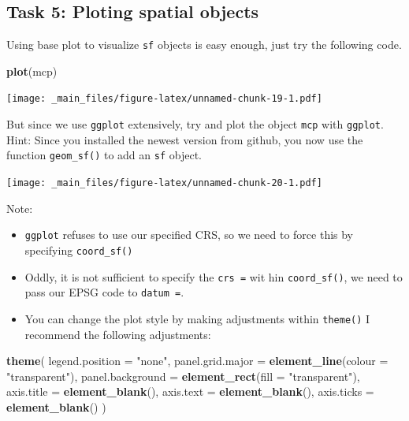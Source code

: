 \documentclass[]{book}
\newenvironment{Shaded}{\begin{snugshade}}{\end{snugshade}}
\newcommand{\KeywordTok}[1]{\textcolor[rgb]{0.13,0.29,0.53}{\textbf{{#1}}}}
\newcommand{\DataTypeTok}[1]{\textcolor[rgb]{0.13,0.29,0.53}{{#1}}}
\newcommand{\StringTok}[1]{\textcolor[rgb]{0.31,0.60,0.02}{{#1}}}
\newcommand{\NormalTok}[1]{{#1}}
\providecommand{\tightlist}{%
  \setlength{\itemsep}{0pt}\setlength{\parskip}{0pt}}
\theoremstyle{definition}
\theoremstyle{definition}
\theoremstyle{definition}
\theoremstyle{remark}
\begin{document}
\subsection{Task 5: Ploting spatial
objects}\label{task-5-ploting-spatial-objects}

Using base plot to visualize \texttt{sf} objects is easy enough, just
try the following code.

\begin{Shaded}
\begin{Highlighting}[]
\KeywordTok{plot}\NormalTok{(mcp)}
\end{Highlighting}
\end{Shaded}

\texttt{[image: \_main\_files/figure-latex/unnamed-chunk-19-1.pdf]}

But since we use \texttt{ggplot} extensively, try and plot the object
\texttt{mcp} with \texttt{ggplot}. Hint: Since you installed the newest
version from github, you now use the function \texttt{geom\_sf()} to add
an \texttt{sf} object.

\texttt{[image: \_main\_files/figure-latex/unnamed-chunk-20-1.pdf]}

Note:

\begin{itemize}
\tightlist
\item
  \texttt{ggplot} refuses to use our specified CRS, so we need to force
  this by specifying \texttt{coord\_sf()}
\item
  Oddly, it is not sufficient to specify the \texttt{crs\ =} wit hin
  \texttt{coord\_sf()}, we need to pass our EPSG code to
  \texttt{datum\ =}.
\item
  You can change the plot style by making adjustments within
  \texttt{theme()} I recommend the following adjustments:
\end{itemize}

\begin{Shaded}
\begin{Highlighting}[]
\KeywordTok{theme}\NormalTok{(}
  \DataTypeTok{legend.position =} \StringTok{"none"}\NormalTok{,}
  \DataTypeTok{panel.grid.major =} \KeywordTok{element_line}\NormalTok{(}\DataTypeTok{colour =} \StringTok{"transparent"}\NormalTok{),}
  \DataTypeTok{panel.background =} \KeywordTok{element_rect}\NormalTok{(}\DataTypeTok{fill =} \StringTok{"transparent"}\NormalTok{),}
  \DataTypeTok{axis.title =} \KeywordTok{element_blank}\NormalTok{(),}
  \DataTypeTok{axis.text =} \KeywordTok{element_blank}\NormalTok{(),}
  \DataTypeTok{axis.ticks =} \KeywordTok{element_blank}\NormalTok{()}
  \NormalTok{)}
\end{Highlighting}
\end{Shaded}
\end{document}
